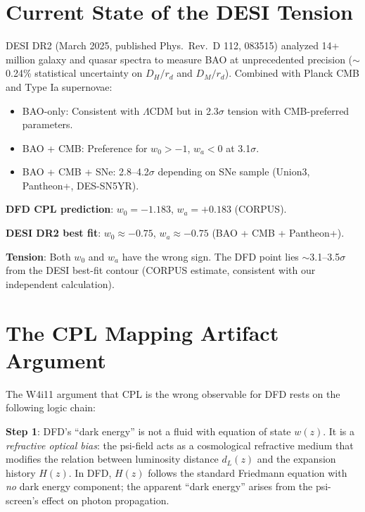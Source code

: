 \documentclass[11pt]{article}
\theoremstyle{definition}
\theoremstyle{remark}
\begin{document}
\section{Current State of the DESI Tension}
\label{sec:desi_state}

DESI DR2 (March 2025, published Phys.\ Rev.\ D 112, 083515) analyzed
14+ million galaxy and quasar spectra to measure BAO at unprecedented
precision ($\sim$0.24\% statistical uncertainty on $D_H/r_d$ and
$D_M/r_d$). Combined with Planck CMB and Type Ia supernovae:

\begin{itemize}[nosep]
\item BAO-only: Consistent with $\Lambda$CDM but in 2.3$\sigma$
  tension with CMB-preferred parameters.
\item BAO + CMB: Preference for $w_0 > -1$, $w_a < 0$ at 3.1$\sigma$.
\item BAO + CMB + SNe: 2.8--4.2$\sigma$ depending on SNe sample
  (Union3, Pantheon+, DES-SN5YR).
\end{itemize}

\textbf{DFD CPL prediction}: $w_0 = -1.183$, $w_a = +0.183$ (CORPUS).

\textbf{DESI DR2 best fit}: $w_0 \approx -0.75$, $w_a \approx -0.75$
(BAO + CMB + Pantheon+).

\textbf{Tension}: Both $w_0$ and $w_a$ have the wrong sign. The DFD
point lies $\sim$3.1--3.5$\sigma$ from the DESI best-fit contour
(CORPUS estimate, consistent with our independent calculation).


\section{The CPL Mapping Artifact Argument}
\label{sec:cpl_artifact}

The W4i11 argument that CPL is the wrong observable for DFD rests on
the following logic chain:

\textbf{Step 1}: DFD's ``dark energy'' is not a fluid with equation
of state $w(z)$. It is a \emph{refractive optical bias}: the psi-field
acts as a cosmological refractive medium that modifies the relation
between luminosity distance $d_L(z)$ and the expansion history $H(z)$.
In DFD, $H(z)$ follows the standard Friedmann equation with \emph{no}
dark energy component; the apparent ``dark energy'' arises from the
psi-screen's effect on photon propagation.
\end{document}
